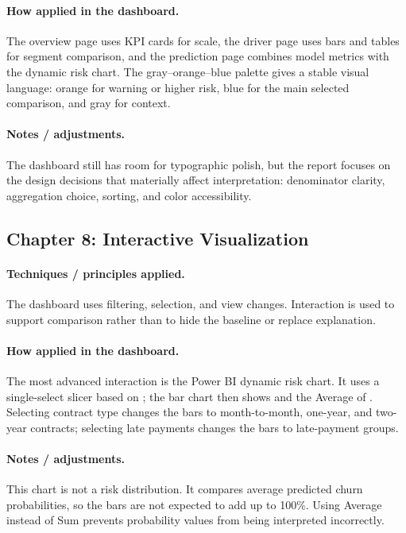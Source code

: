 \paragraph{How applied in the dashboard.}
The overview page uses KPI cards for scale, the driver page uses bars and
tables for segment comparison, and the prediction page combines model metrics
with the dynamic risk chart. The gray--orange--blue palette gives a stable
visual language: orange for warning or higher risk, blue for the main selected
comparison, and gray for context.

\paragraph{Notes / adjustments.}
The dashboard still has room for typographic polish, but the report focuses on
the design decisions that materially affect interpretation: denominator clarity,
aggregation choice, sorting, and color accessibility.

\subsection{Chapter 8: Interactive Visualization}
\paragraph{Techniques / principles applied.}
The dashboard uses filtering, selection, and view changes. Interaction is used
to support comparison rather than to hide the baseline or replace explanation.

\paragraph{How applied in the dashboard.}
The most advanced interaction is the Power BI dynamic risk chart. It uses a
single-select slicer based on ; the bar
chart then shows  and the Average of
. Selecting contract type
changes the bars to month-to-month, one-year, and two-year contracts; selecting
late payments changes the bars to late-payment groups.

\paragraph{Notes / adjustments.}
This chart is not a risk distribution. It compares average predicted churn
probabilities, so the bars are not expected to add up to 100\%. Using Average
instead of Sum prevents probability values from being interpreted incorrectly.

